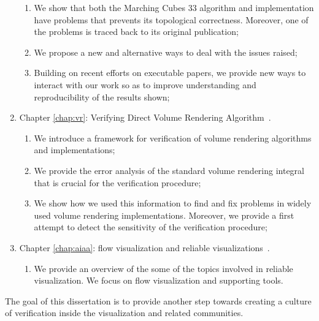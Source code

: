 \begin{enumerate}[noitemsep,topsep=0pt,parsep=0pt,partopsep=0pt]
\begin{enumerate}
\setlength{\itemsep}{0pt}
\item We show that both the Marching Cubes 33 algorithm and implementation have problems that prevents its topological correctness. Moreover, one of the problems is traced back to its original publication;
\item We propose a new and alternative ways to deal with the issues raised;
\item Building on recent efforts on executable papers, we provide new ways to interact with our work so as to improve understanding and reproducibility of the results shown;
\end{enumerate}
\item Chapter \ref{chap:vr}: Verifying Direct Volume Rendering Algorithm~\cite{Etiene:2013}.
\begin{enumerate}
\setlength{\itemsep}{0pt}
\item We introduce a framework for verification of volume rendering algorithms and implementations;
\item We provide the error analysis of the standard volume rendering integral that is crucial for the verification procedure;
\item We show how we used this information to find and fix problems in widely used volume rendering  implementations. Moreover, we provide a first attempt to detect the sensitivity of the verification procedure;
\end{enumerate}
\item Chapter \ref{chap:aiaa}: flow visualization and reliable visualizations~\cite{Etiene:Flow:2013}.
\begin{enumerate}
\setlength{\itemsep}{0pt}
\item We provide an overview of the some of the topics involved in reliable visualization. We focus on flow visualization and supporting tools.
\end{enumerate}
\end{enumerate}
The goal of this dissertation is to provide another step towards creating a culture of verification inside the visualization and related communities.

